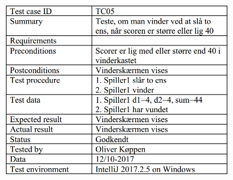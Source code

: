 \begin{figure}[h]
    \begin{center}
        \includegraphics[width=10cm]{graphics/TC05}
    \end{center}
\end{figure}